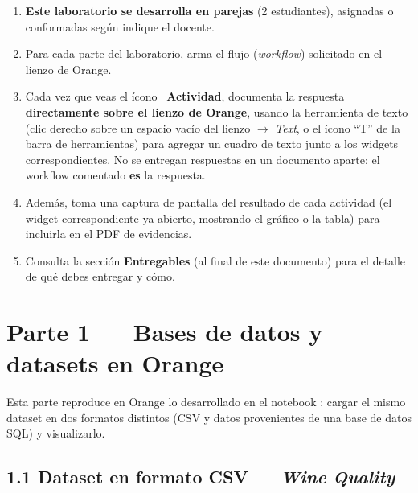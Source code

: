 \documentclass[11pt,letterpaper]{article}
\newcommand{\faPencil}{\raisebox{-0.1em}{\textbf{\Large\textbullet}}}
\begin{document}
\begin{enumerate}[leftmargin=1.2cm]
  \item \textbf{Este laboratorio se desarrolla en parejas} (2 estudiantes), asignadas o conformadas según indique el docente.
  \item Para cada parte del laboratorio, arma el flujo (\textit{workflow}) solicitado en el lienzo de Orange.
  \item Cada vez que veas el ícono \faPencil\ \textbf{Actividad}, documenta la respuesta \textbf{directamente sobre el lienzo de Orange}, usando la herramienta de texto (clic derecho sobre un espacio vacío del lienzo $\to$ \textit{Text}, o el ícono ``T'' de la barra de herramientas) para agregar un cuadro de texto junto a los widgets correspondientes. No se entregan respuestas en un documento aparte: el workflow comentado \textbf{es} la respuesta.
  \item Además, toma una captura de pantalla del resultado de cada actividad (el widget correspondiente ya abierto, mostrando el gráfico o la tabla) para incluirla en el PDF de evidencias.
  \item Consulta la sección \textbf{Entregables} (al final de este documento) para el detalle de qué debes entregar y cómo.
\end{enumerate}

\section{Parte 1 --- Bases de datos y datasets en Orange}

Esta parte reproduce en Orange lo desarrollado en el notebook \texttt{}: cargar el mismo dataset en dos formatos distintos (CSV y datos provenientes de una base de datos SQL) y visualizarlo.

\subsection{1.1 Dataset en formato CSV --- \textit{Wine Quality}}
\end{document}
